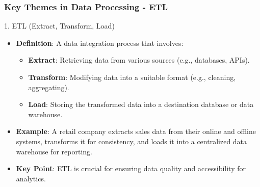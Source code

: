 \documentclass[aspectratio=169]{beamer}
\begin{document}
\begin{frame}[fragile]
    \frametitle{Key Themes in Data Processing - ETL}
    \begin{block}{1. ETL (Extract, Transform, Load)}
        \begin{itemize}
            \item \textbf{Definition}: A data integration process that involves:
            \begin{itemize}
                \item \textbf{Extract}: Retrieving data from various sources (e.g., databases, APIs).
                \item \textbf{Transform}: Modifying data into a suitable format (e.g., cleaning, aggregating).
                \item \textbf{Load}: Storing the transformed data into a destination database or data warehouse.
            \end{itemize}
            \item \textbf{Example}: A retail company extracts sales data from their online and offline systems, transforms it for consistency, and loads it into a centralized data warehouse for reporting.
            \item \textbf{Key Point}: ETL is crucial for ensuring data quality and accessibility for analytics.
        \end{itemize}
    \end{block}
\end{frame}
\end{document}

